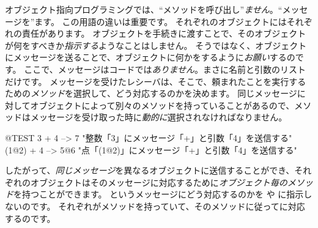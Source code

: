 \documentclass[a4paper,10pt,twoside]{book}
\begin{document}
オブジェクト指向プログラミングでは、``メソッドを呼び出し''\emph{ません}。``メッセージを''ます。
この用語の違いは重要です。
それぞれのオブジェクトにはそれぞれの責任があります。
オブジェクトを手続きに渡すことで、そのオブジェクトが何をすべきか\emph{指示する}ようなことはしません。
そうではなく、オブジェクトにメッセージを送ることで、オブジェクトに何かをするように\emph{お願い}するのです。
ここで、メッセージはコードでは\emph{ありません}。まさに名前と引数のリストだけです。
メッセージを受けたレシーバは、そこで、頼まれたことを実行するための\emph{メソッド}を選択して、どう対応するのかを決めます。
同じメッセージに対してオブジェクトによって別々のメソッドを持っていることがあるので、メソッドはメッセージを受け取った時に\emph{動的に}選択されなければなりません。
\begin{code}{@TEST}
3 + 4         --> 7          "整数「3」にメッセージ「+」と引数「4」を送信する"
(1@2) + 4 --> 5@6    "点「(1@2)」にメッセージ「+」と引数「4」を送信する"
\end{code}
\noindent
したがって、\emph{同じメッセージ}を異なるオブジェクトに送信することができ、それぞれのオブジェクトはそのメッセージに対応するために\emph{オブジェクト毎のメソッド}を持つことができます。
というメッセージにどう対応するのかを や に指示しないのです。
それぞれが\ct{+}メソッドを持っていて、そのメソッドに従ってに対応するのです。
\end{document}
